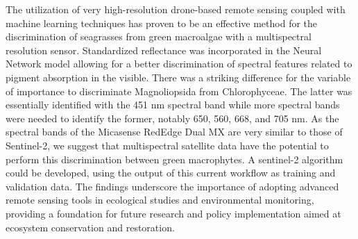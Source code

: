 \documentclass[
  number]{elsarticle}
\begin{document}
The utilization of very high-resolution drone-based remote sensing
coupled with machine learning techniques has proven to be an effective
method for the discrimination of seagrasses from green macroalgae with a
multispectral resolution sensor. Standardized reflectance was
incorporated in the Neural Network model allowing for a better
discrimination of spectral features related to pigment absorption in the
visible. There was a striking difference for the variable of importance
to discriminate Magnoliopsida from Chlorophyceae. The latter was
essentially identified with the 451 nm spectral band while more spectral
bands were needed to identify the former, notably 650, 560, 668, and 705
nm. As the spectral bands of the Micasense RedEdge Dual MX are very
similar to those of Sentinel-2, we suggest that multispectral satellite
data have the potential to perform this discrimination between green
macrophytes. A sentinel-2 algorithm could be developed, using the output
of this current workflow as training and validation data. The findings
underscore the importance of adopting advanced remote sensing tools in
ecological studies and environmental monitoring, providing a foundation
for future research and policy implementation aimed at ecosystem
conservation and restoration.


  
\end{document}
